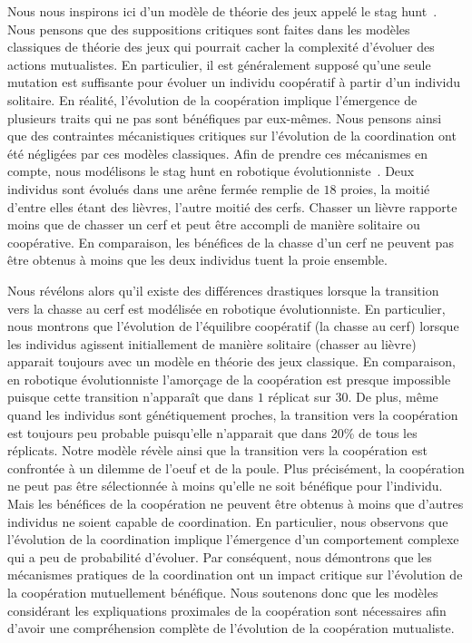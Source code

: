 			Nous nous inspirons ici d'un modèle de théorie des jeux appelé le stag hunt~\parencite{Skyrms2004}. Nous pensons que des suppositions critiques sont faites dans les modèles classiques de théorie des jeux qui pourrait cacher la complexité d'évoluer des actions mutualistes. En particulier, il est généralement supposé qu'une seule mutation est suffisante pour évoluer un individu coopératif à partir d'un individu solitaire. En réalité, l'évolution de la coopération implique l'émergence de plusieurs traits qui ne pas sont bénéfiques par eux-mêmes. Nous pensons ainsi que des contraintes mécanistiques critiques sur l'évolution de la coordination ont été négligées par ces modèles classiques. Afin de prendre ces mécanismes en compte, nous modélisons le stag hunt en robotique évolutionniste~\parencite{Nolfi2000, Doncieux2015a}. Deux individus sont évolués dans une arêne fermée remplie de $18$ proies, la moitié d'entre elles étant des lièvres, l'autre moitié des cerfs. Chasser un lièvre rapporte moins que de chasser un cerf et peut être accompli de manière solitaire ou coopérative. En comparaison, les bénéfices de la chasse d'un cerf ne peuvent pas être obtenus à moins que les deux individus tuent la proie ensemble.

			Nous révélons alors qu'il existe des différences drastiques lorsque la transition vers la chasse au cerf est modélisée en robotique évolutionniste. En particulier, nous montrons que l'évolution de l'équilibre coopératif (la chasse au cerf) lorsque les individus agissent initiallement de manière solitaire (chasser au lièvre) apparait toujours avec un modèle en théorie des jeux classique. En comparaison, en robotique évolutionniste l'amorçage de la coopération est presque impossible puisque cette transition n'apparaît que dans $1$ réplicat sur $30$. De plus, même quand les individus sont génétiquement proches, la transition vers la coopération est toujours peu probable puisqu'elle n'apparait que dans 20\% de tous les réplicats. Notre modèle révèle ainsi que la transition vers la coopération est confrontée à un dilemme de l'oeuf et de la poule. Plus précisément, la coopération ne peut pas être sélectionnée à moins qu'elle ne soit bénéfique pour l'individu. Mais les bénéfices de la coopération ne peuvent être obtenus à moins que d'autres individus ne soient capable de coordination. En particulier, nous observons que l'évolution de la coordination implique l'émergence d'un comportement complexe qui a peu de probabilité d'évoluer. Par conséquent, nous démontrons que les mécanismes pratiques de la coordination ont un impact critique sur l'évolution de la coopération mutuellement bénéfique. Nous soutenons donc que les modèles considérant les expliquations proximales de la coopération sont nécessaires afin d'avoir une compréhension complète de l'évolution de la coopération mutualiste.


